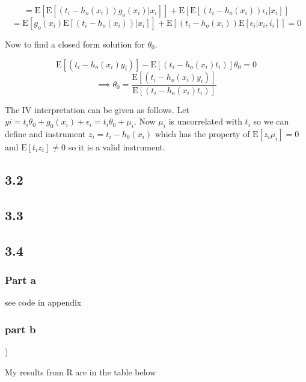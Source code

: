 \documentclass[11pt]{article}
\newcommand{\E}{\mathrm{E}}
\begin{document}
$$ = \E[\E[(t_i - h_o(x_i))g_o(x_i)|x_i]] + \E[\E[(t_i - h_o(x_i))\epsilon_i|x_i]] 
$$
$$ = \E[g_o(x_i)\E[(t_i - h_o(x_i))|x_i]] + \E[(t_i - h_o(x_i))\E[\epsilon_i|x_i, i_i]] = 0 $$

Now to find a closed form solution for $\theta_0$. 

$$ \E[(t_i - h_o(x_i)y_i )] - \E[(t_i - h_o(x_i)t_i)] \theta_0 = 0$$
$$ \implies \theta_0= \frac{\E[(t_i - h_o(x_i)y_i )] }{\E[(t_i - h_o(x_i)t_i)]}
$$

The IV interpretation can be given as follows. Let $yi=t_i \theta_0 + g_0(x_i) + \epsilon_i = t_i \theta_0 + \mu_i$. Now $\mu_i$ is uncorrelated with $t_i$ so we can define and instrument $z_i = t_i - h_0(x_i) $ which has the property of $\E[z_i\mu_i] = 0$ and $\E[t_iz_i] \neq 0$ so it is a valid instrument. 

\subsection{3.2}

\subsection{3.3}

\subsection{3.4}
\subsubsection{Part a}
see code in appendix 
\subsubsection{part b})

My results from R are in the table below 

\begin{center}
	
\end{center}


\end{document}

